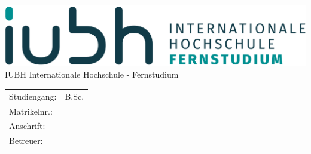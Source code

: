 \begin{titlepage}
	\centering
	{\Large\textbf{\IUBHTexttype} \par}
	\vspace{2em}
	{\Huge\textbf{\IUBHTitleDe} \par}
	\vspace{0.5em}	
	{\Large\textbf{\IUBHTitleEn} \par}
	\vspace{1.5em}
	{\Large \IUBHStudentName \par}
	\vspace{1em}
	{\Large \IUBHDateOfWork \par}
	\vspace{2em}
	\includegraphics[scale=0.35]{fixedsrc/IUBH_FS_Logo_DE} \\
	\vspace{1em}
	IUBH Internationale Hochschule - Fernstudium \\
	\vspace{3em}
	\begin{tabular}{ll}
		\toprule
		Studiengang: & B.Sc. \IUBHCourse \\
		Matrikelnr.: & \IUBHStudentNumber \\
		Anschrift: & \IUBHStudentAddress \\
		Betreuer: & \IUBHSupervisors \\
		\bottomrule
	\end{tabular}	
\end{titlepage}
\newpage